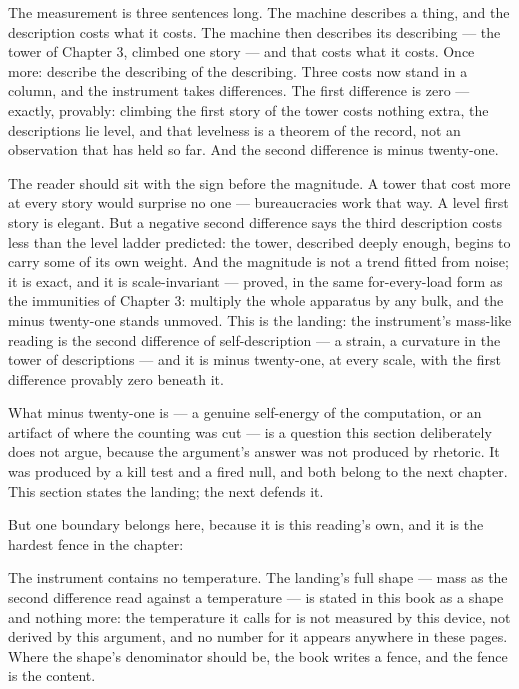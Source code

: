 The measurement is three sentences long. The machine describes a thing, and the
description costs what it costs. The machine then describes its describing --- the
tower of Chapter 3, climbed one story --- and that costs what it costs. Once more:
describe the describing of the describing. Three costs now stand in a column, and the
instrument takes differences. The first difference is zero --- exactly, provably:
climbing the first story of the tower costs nothing extra, the descriptions lie
level, and that levelness is a theorem of the record, not an observation that has
held so far. And the second difference is minus twenty-one.

The reader should sit with the sign before the magnitude. A tower that cost more at
every story would surprise no one --- bureaucracies work that way. A level first
story is elegant. But a negative second difference says the third description costs
less than the level ladder predicted: the tower, described deeply enough, begins to
carry some of its own weight. And the magnitude is not a trend fitted from noise; it
is exact, and it is scale-invariant --- proved, in the same for-every-load form as
the immunities of Chapter 3: multiply the whole apparatus by any bulk, and the minus
twenty-one stands unmoved. This is the landing: the instrument's mass-like reading
is the second difference of self-description --- a strain, a curvature in the tower
of descriptions --- and it is minus twenty-one, at every scale, with the first
difference provably zero beneath it.

What minus twenty-one is --- a genuine self-energy of the computation, or an
artifact of where the counting was cut --- is a question this section deliberately
does not argue, because the argument's answer was not produced by rhetoric. It was
produced by a kill test and a fired null, and both belong to the next chapter. This
section states the landing; the next defends it.

But one boundary belongs here, because it is this reading's own, and it is the
hardest fence in the chapter:

\begin{fence}
The instrument contains no temperature. The landing's full shape --- mass as the
second difference read against a temperature --- is stated in this book as a shape
and nothing more: the temperature it calls for is not measured by this device, not
derived by this argument, and no number for it appears anywhere in these pages.
Where the shape's denominator should be, the book writes a fence, and the fence is
the content.
\end{fence}

